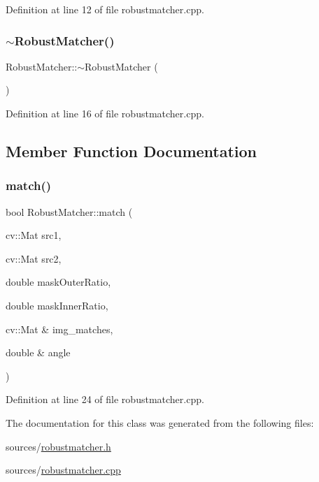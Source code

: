 Definition at line 12 of file robustmatcher.\+cpp.

\mbox{\label{class_robust_matcher_ae8831ade1c296513fcad9764a05d3328}} 
\subsubsection{\texorpdfstring{$\sim$\+Robust\+Matcher()}{~RobustMatcher()}}
{\footnotesize\ttfamily Robust\+Matcher\+::$\sim$\+Robust\+Matcher (\begin{DoxyParamCaption}{ }\end{DoxyParamCaption})}



Definition at line 16 of file robustmatcher.\+cpp.



\subsection{Member Function Documentation}
\mbox{\label{class_robust_matcher_a00bcb865bcc240ec0df38cecf5243f5e}} 
\subsubsection{\texorpdfstring{match()}{match()}}
{\footnotesize\ttfamily bool Robust\+Matcher\+::match (\begin{DoxyParamCaption}\item[{cv\+::\+Mat}]{src1,  }\item[{cv\+::\+Mat}]{src2,  }\item[{double}]{mask\+Outer\+Ratio,  }\item[{double}]{mask\+Inner\+Ratio,  }\item[{cv\+::\+Mat \&}]{img\+\_\+matches,  }\item[{double \&}]{angle }\end{DoxyParamCaption})}



Definition at line 24 of file robustmatcher.\+cpp.



The documentation for this class was generated from the following files\+:\begin{DoxyCompactItemize}
\item 
sources/\mbox{\hyperlink{robustmatcher_8h}{robustmatcher.\+h}}\item 
sources/\mbox{\hyperlink{robustmatcher_8cpp}{robustmatcher.\+cpp}}\end{DoxyCompactItemize}
